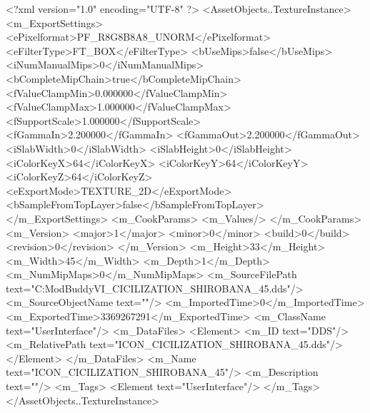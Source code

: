 <?xml version="1.0" encoding="UTF-8" ?>
<AssetObjects..TextureInstance>
	<m_ExportSettings>
		<ePixelformat>PF_R8G8B8A8_UNORM</ePixelformat>
		<eFilterType>FT_BOX</eFilterType>
		<bUseMips>false</bUseMips>
		<iNumManualMips>0</iNumManualMips>
		<bCompleteMipChain>true</bCompleteMipChain>
		<fValueClampMin>0.000000</fValueClampMin>
		<fValueClampMax>1.000000</fValueClampMax>
		<fSupportScale>1.000000</fSupportScale>
		<fGammaIn>2.200000</fGammaIn>
		<fGammaOut>2.200000</fGammaOut>
		<iSlabWidth>0</iSlabWidth>
		<iSlabHeight>0</iSlabHeight>
		<iColorKeyX>64</iColorKeyX>
		<iColorKeyY>64</iColorKeyY>
		<iColorKeyZ>64</iColorKeyZ>
		<eExportMode>TEXTURE_2D</eExportMode>
		<bSampleFromTopLayer>false</bSampleFromTopLayer>
	</m_ExportSettings>
	<m_CookParams>
		<m_Values/>
	</m_CookParams>
	<m_Version>
		<major>1</major>
		<minor>0</minor>
		<build>0</build>
		<revision>0</revision>
	</m_Version>
	<m_Height>33</m_Height>
	<m_Width>45</m_Width>
	<m_Depth>1</m_Depth>
	<m_NumMipMaps>0</m_NumMipMaps>
	<m_SourceFilePath text="C:\Users\asus\Documents\Firaxis ModBuddy\Civilization VI\temppic\ICON_CICILIZATION_SHIROBANA_45.dds"/>
	<m_SourceObjectName text=""/>
	<m_ImportedTime>0</m_ImportedTime>
	<m_ExportedTime>3369267291</m_ExportedTime>
	<m_ClassName text="UserInterface"/>
	<m_DataFiles>
		<Element>
			<m_ID text="DDS"/>
			<m_RelativePath text="ICON_CICILIZATION_SHIROBANA_45.dds"/>
		</Element>
	</m_DataFiles>
	<m_Name text="ICON_CICILIZATION_SHIROBANA_45"/>
	<m_Description text=""/>
	<m_Tags>
		<Element text="UserInterface"/>
	</m_Tags>
</AssetObjects..TextureInstance>

